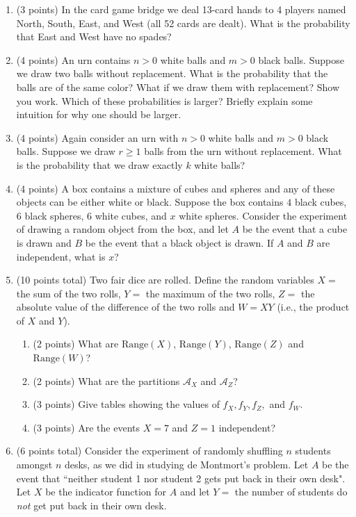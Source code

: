 \documentclass[11pt]{article}
\newcommand{\Range}{{\mathrm{Range}}}
\newcommand{\A}{{\mathcal{A}}}
\begin{document}
\begin{enumerate}

\item (3 points) In the card game bridge we deal 13-card hands to 4 players
named North, South, East, and West (all 52 cards are dealt).  What is the
probability that East and West have no spades?

\item (4 points) An urn contains $n>0$ white balls and $m>0$ black balls.
Suppose we draw two balls without replacement.  What is the probability that
the balls are of the same color?  What if we draw them with replacement?  Show
you work.  Which of these probabilities is larger?  Briefly explain some
intuition for why one should be larger.

\item (4 points) Again consider an urn with $n>0$ white balls and $m >0$ black
balls.  Suppose we draw $r\geq 1$ balls from the urn without replacement.  What
is the probability that we draw exactly $k$ white balls?

\item (4 points) A box contains a mixture of cubes and spheres and any of these
objects can be either white or black.  Suppose the box contains $4$ black
cubes, $6$ black spheres, $6$ white cubes, and $x$ white spheres.  Consider the
experiment of drawing a random object from the box, and let $A$ be the event
that a cube is drawn and $B$ be the event that a black object is drawn.
If $A$ and $B$ are independent, what is $x$?

\item (10 points total) Two fair dice are rolled.  Define the random variables
$X =$ the sum of the two rolls,
$Y =$ the maximum of the two rolls,
$Z =$ the absolute value of the difference of the two rolls
and $W = XY$ (i.e., the product of $X$ and $Y$).
\begin{enumerate}
 \item (2 points) What are $\Range(X)$, $\Range(Y)$, $\Range(Z)$ and
 $\Range(W)$?

 \item (2 points) What are the partitions $\A_X$ and $\A_Z$?
 \item (3 points) Give tables showing the values of $f_X,f_Y,f_Z,$ and $f_W$.
 \item (3 points) Are the events $X =7$ and $Z=1$ independent?
\end{enumerate}

\item (6 points total) Consider the experiment of randomly shuffling
$n$ students amongst $n$ desks, as we did in studying de Montmort's problem.
Let $A$ be the event that ``neither student 1 nor student 2 gets
put back in their own desk".
Let $X$ be the indicator function for $A$ and let $Y = $ the number of
students do \emph{not} get put back in their own desk.


\end{enumerate}
\end{document}
